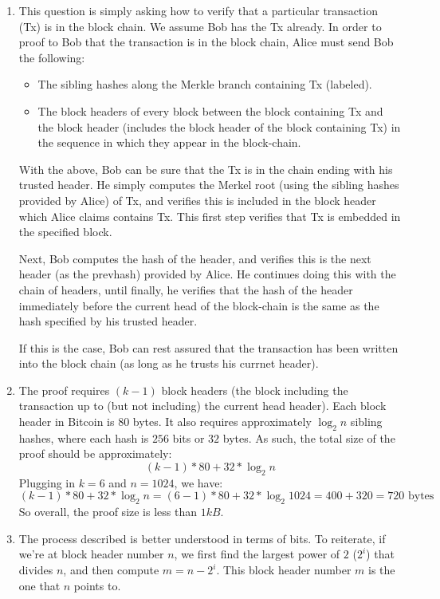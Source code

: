\documentclass[12pt]{exam}
\newcommand{\Q}[1]{\question{\large{\textbf{#1}}}}
\begin{document}
\begin{questions}
\newpage
\Q{Lightweight clients}
\begin{solution}
\begin{enumerate}[label=\textbf{\alph*.}]
  \item
    This question is simply asking how to verify that a particular transaction (Tx) is in the block chain. We assume Bob has the Tx already. In order to proof to Bob that the transaction is in the block chain, Alice must send Bob the following:
    \begin{itemize}
      \item The sibling hashes along the Merkle branch containing Tx (labeled).
      \item The block headers of every block between the block containing Tx and the block header (includes the block header of the block containing Tx) in the sequence in which they appear in the block-chain.
    \end{itemize}
    With the above, Bob can be sure that the Tx is in the chain ending with his trusted header. He simply computes the Merkel root (using the sibling hashes provided by Alice) of Tx, and verifies this is included in the block header which Alice claims contains Tx. This first step verifies that Tx is embedded in the specified block.

    Next, Bob computes the hash of the header, and verifies this is the next header (as the prevhash) provided by Alice. He continues doing this with the chain of headers, until finally, he verifies that the hash of the header immediately before the current head of the block-chain is the same as the hash specified by his trusted header.

    If this is the case, Bob can rest assured that the transaction has been written into the block chain (as long as he trusts his currnet header).

  \item
    The proof requires $(k-1)$ block headers (the block including the transaction up to (but not including) the current head header). Each block header in Bitcoin is $80$ bytes. It also requires approximately $\log_2 n$ sibling hashes, where each hash is $256$ bits or $32$ bytes. As such, the total size of the proof should be approximately:
    \[
      (k-1)*80 + 32*\log_2 n
    \]
    Plugging in $k = 6$ and $n = 1024$, we have:
    \[
      (k-1)*80 + 32*\log_2 n = (6-1)*80 + 32 * \log_2 1024 = 400 + 320 = 720 \text{ bytes }
    \]
    So overall, the proof size is less than $1kB$.

  \item
    The process described is better understood in terms of bits. To reiterate, if we're at block header number $n$, we first find the largest power of $2$ ($2^i$) that divides $n$, and then compute $m = n - 2^i$. This block header number $m$ is the one that $n$ points to.


\end{enumerate}
\end{solution}
\end{questions}
\end{document}
